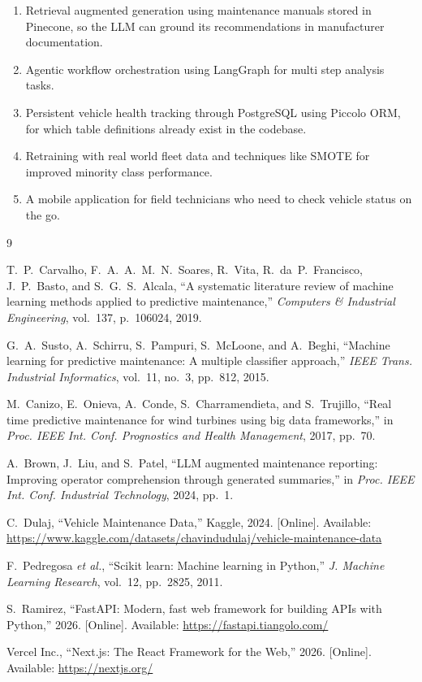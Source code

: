 \documentclass[conference]{IEEEtran}
\begin{document}
\begin{enumerate}
    \item Retrieval augmented generation using maintenance manuals stored in Pinecone, so the LLM can ground its recommendations in manufacturer documentation.
    \item Agentic workflow orchestration using LangGraph for multi step analysis tasks.
    \item Persistent vehicle health tracking through PostgreSQL using Piccolo ORM, for which table definitions already exist in the codebase.
    \item Retraining with real world fleet data and techniques like SMOTE for improved minority class performance.
    \item A mobile application for field technicians who need to check vehicle status on the go.
\end{enumerate}

\begin{thebibliography}{9}

T.~P.~Carvalho, F.~A.~A.~M.~N.~Soares, R.~Vita, R.~da~P.~Francisco, J.~P.~Basto, and S.~G.~S.~Alcala,
``A systematic literature review of machine learning methods applied to predictive maintenance,''
\textit{Computers \& Industrial Engineering}, vol.~137, p.~106024, 2019.

G.~A.~Susto, A.~Schirru, S.~Pampuri, S.~McLoone, and A.~Beghi,
``Machine learning for predictive maintenance: A multiple classifier approach,''
\textit{IEEE Trans. Industrial Informatics}, vol.~11, no.~3, pp.~812, 2015.

M.~Canizo, E.~Onieva, A.~Conde, S.~Charramendieta, and S.~Trujillo,
``Real time predictive maintenance for wind turbines using big data frameworks,''
in \textit{Proc. IEEE Int. Conf. Prognostics and Health Management}, 2017, pp.~70.

A.~Brown, J.~Liu, and S.~Patel,
``LLM augmented maintenance reporting: Improving operator comprehension through generated summaries,''
in \textit{Proc. IEEE Int. Conf. Industrial Technology}, 2024, pp.~1.

C.~Dulaj,
``Vehicle Maintenance Data,''
Kaggle, 2024. [Online]. Available: \url{https://www.kaggle.com/datasets/chavindudulaj/vehicle-maintenance-data}

F.~Pedregosa \textit{et al.},
``Scikit learn: Machine learning in Python,''
\textit{J. Machine Learning Research}, vol.~12, pp.~2825, 2011.

S.~Ramirez,
``FastAPI: Modern, fast web framework for building APIs with Python,''
2026. [Online]. Available: \url{https://fastapi.tiangolo.com/}

Vercel Inc.,
``Next.js: The React Framework for the Web,''
2026. [Online]. Available: \url{https://nextjs.org/}

\end{thebibliography}
\end{document}
